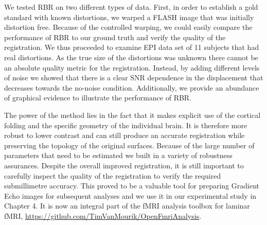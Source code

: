We tested RBR on two different types of data. First, in order to establish a gold standard with known distortions, we warped a FLASH image that was initially distortion free. Because of the controlled warping, we could easily compare the performance of RBR to our ground truth and verify the quality of the registration. We thus proceeded to examine EPI data set of 11 subjects that had real distortions. As the true size of the distortions was unknown there cannot be an absolute quality metric for the registration. Instead, by adding different levels of noise we showed that there is a clear SNR dependence in the displacement that decreases towards the no-noise condition. Additionally, we provide an abundance of graphical evidence to illustrate the performance of RBR.

The power of the method lies in the fact that it makes explicit use of the cortical folding and the specific geometry of the individual brain. It is therefore more robust to lower contrast and can still produce an accurate registration while preserving the topology of the original surfaces. Because of the large number of parameters that need to be estimated we built in a variety of robustness assurances. Despite the overall improved registration, it is still important to carefully inspect the quality of the registration to verify the required submillimetre accuracy. This proved to be a valuable tool for preparing Gradient Echo images for subsequent analyses and we use it in our experimental study in Chapter 4. It is now an integral part of the fMRI analysis toolbox for laminar fMRI, \url{https://github.com/TimVanMourik/OpenFmriAnalysis}.

